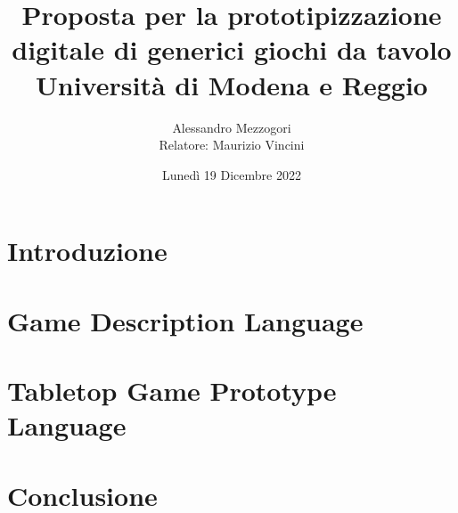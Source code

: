 \documentclass[12pt, oneside]{report}
\title{
    {Proposta per la prototipizzazione digitale di generici giochi da tavolo} \\
    {\large Università di Modena e Reggio} \\
}
\author{Alessandro Mezzogori\\[0.5cm]{Relatore: Maurizio Vincini}}
\date{Lunedì 19 Dicembre 2022}
\newcommand{\blankpage}{
    \null
    \thispagestyle{empty}
    \addtocounter{page}{-1}
    \newpage
}
\begin{document}
\maketitle
\blankpage
\tableofcontents

\chapter{Introduzione}


\chapter{Game Description Language}


\chapter{Tabletop Game Prototype Language}


\chapter{Conclusione}


\printbibliography
\end{document}
